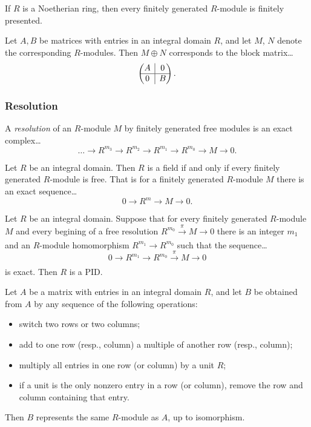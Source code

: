 \begin{lemma}
If $R$ is a Noetherian ring, then every finitely generated $R$-module is finitely presented.
\end{lemma}

\begin{lemma}
Let $A,B$ be matrices with entries in an integral domain $R$, and let $M$, $N$ denote the corresponding $R$-modules. Then
$M \oplus N$ corresponds to the block matrix\dots
\[
\begin{pmatrix}
A & \rvline & 0\\ \hline
0 & \rvline & B
\end{pmatrix}.
\]
\end{lemma}

\subsubsection{Resolution}\label{resolution}
A \emph{resolution} of an $R$-module $M$ by finitely generated free modules is an exact complex\dots
$$\dots \longrightarrow R^{m_3} \longrightarrow R^{m_2} \longrightarrow R^{m_1} \longrightarrow R^{m_0} \longrightarrow M \longrightarrow 0.$$

\begin{proposition}
Let $R$ be an integral domain. Then $R$ is a field if and only if every finitely generated $R$-module is free. That is for a finitely generated $R$-module $M$
there is an exact sequence\dots
$$0 \longrightarrow R^m \longrightarrow M \longrightarrow 0.$$
\end{proposition}

\begin{proposition}
Let $R$ be an integral domain. Suppose that for every finitely generated $R$-module $M$ and every begining
of a free resolution $R^{m_0} \xrightarrow[]{\pi} M \rightarrow 0$ there is an integer $m_1$ and an $R$-module homomorphism
$R^{m_1} \rightarrow R^{m_0}$ such that the sequence\dots
$$0 \longrightarrow R^{m_1} \longrightarrow R^{m_0} \xrightarrow[]{\pi} M \longrightarrow 0$$
is exact. Then $R$ is a PID.
\end{proposition}

\begin{proposition}
Let $A$ be a matrix with entries in an integral domain $R$, and let $B$ be obtained from $A$ by any sequence of the following operations:
\begin{itemize}
  \item switch two rows or two columns;
  \item add to one row (resp., column) a multiple of another row (resp., column);
  \item multiply all entries in one row (or column) by a unit $R$;
  \item if a unit is the only nonzero entry in a row (or column), remove the row and column containing that entry.
\end{itemize}
Then $B$ represents the same $R$-module as $A$, up to isomorphism.
\end{proposition}